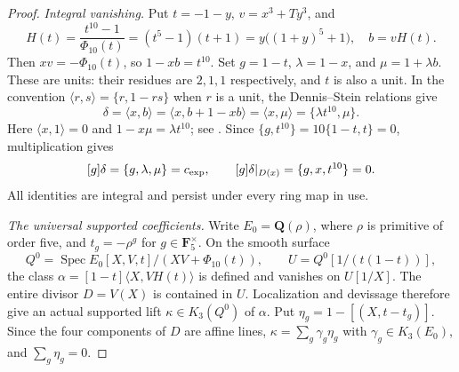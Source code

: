 \documentclass[11pt,a4paper]{article}
\theoremstyle{remark}
\begin{document}
\begin{proof}
\emph{Integral vanishing.}
Put $t=-1-y$, $v=x^3+Ty^3$, and
\[
 H(t)=\frac{t^{10}-1}{\Phi_{10}(t)}=(t^5-1)(t+1)
      =y\bigl((1+y)^5+1\bigr),\quad b=vH(t).
\]
Then $xv=-\Phi_{10}(t)$, so $1-xb=t^{10}$.
Set $g=1-t$, $\lambda=1-x$, and $\mu=1+\lambda b$.
These are units: their residues are $2,1,1$ respectively, and
$t$ is also a unit. In the convention
$\langle r,s\rangle=\{r,1-rs\}$ when $r$ is a unit, the
Dennis--Stein relations give
\[
 \delta=\langle x,b\rangle
 =\langle x,b+1-xb\rangle=\langle x,\mu\rangle
 =\{\lambda t^{10},\mu\}.
\]
Here $\langle x,1\rangle=0$ and $1-x\mu=\lambda t^{10}$;
see \cite[Chapter~III, Definition~5.11 and Exercise~5.6]{Weibel}.
Since $\{g,t^{10}\}=10\{1-t,t\}=0$, multiplication gives
\begin{equation}\label{eq:dimtwoDSidentity}
 [g]\delta=\{g,\lambda,\mu\}=c_{\rm exp},\qquad
 [g]\delta|_{D(x)}=\{g,x,t^{10}\}=0.
\end{equation}
All identities are integral and persist under every ring map in use.

\emph{The universal supported coefficients.}
Write $E_0=\mathbf Q(\rho)$, where $\rho$ is primitive of order five,
and $t_g=-\rho^g$ for $g\in\mathbf F_5^\times$. On the smooth surface
\[
 Q^0=\operatorname{Spec}E_0[X,V,t]/(XV+\Phi_{10}(t)),\qquad
 U=Q^0[1/(t(1-t))],
\]
the class $\alpha=[1-t]\langle X,VH(t)\rangle$ is defined and
vanishes on $U[1/X]$. The entire divisor $D=V(X)$ is contained
in $U$. Localization and devissage therefore give an actual
supported lift $\kappa\in K_3(Q^0)$ of $\alpha$.
Put $\eta_g=1-[(X,t-t_g)]$. Since the four components of $D$
are affine lines, $\kappa=\sum_g\gamma_g\eta_g$ with
$\gamma_g\in K_3(E_0)$, and $\sum_g\eta_g=0$.


\end{proof}
\end{document}
